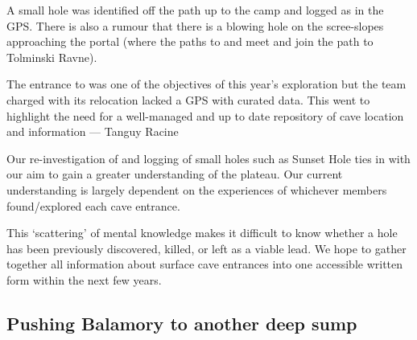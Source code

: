 A small hole was identified off the path up to the camp and logged as  in the GPS. There is also a rumour that there is a blowing hole on the scree-slopes approaching the portal (where the paths to  and  meet and join the path to Tolminski Ravne).

\begin{pagefigure}
\checkoddpage \ifoddpage \forcerectofloat \else \forceversofloat \fi
\centering
{}
\caption{The entrance to   was one of the objectives of this year's exploration but the team charged with its relocation lacked a GPS with curated data. This went to highlight the need for a well-managed  and up to date repository of cave location and information --- Tanguy Racine}
\label{end of expo}
\end{pagefigure}

Our re-investigation of  and logging of small holes such as Sunset Hole ties in with our aim to gain a greater understanding of the plateau. Our current understanding is largely dependent on the experiences of whichever members found/explored each cave entrance.

This ‘scattering’ of mental knowledge makes it difficult to know whether a hole has been previously discovered, killed, or left as a viable lead. We hope to gather together all information about surface cave entrances into one accessible written form within the next few years.


\subsection{Pushing Balamory to another deep sump}

